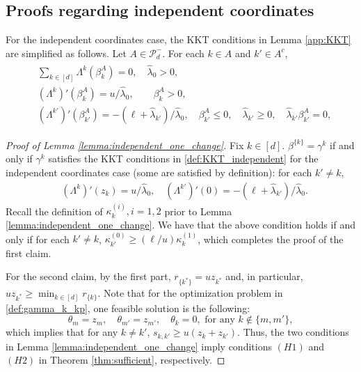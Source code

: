 \documentclass[aap,preprint]{imsart}
\theoremstyle{plain}
\theoremstyle{definition}
\begin{document}
\begin{appendix}
\subsection{Proofs regarding independent coordinates}\label{app:independent_streams}
For the independent coordinates case, the KKT conditions in Lemma \ref{app:KKT} are simplified as follows.
Let $A \in \mathcal{P}_{d}^{-}$.  For each $k \in A$ and $k' \in A^c$,
\begin{align}\label{def:KKT_independent}
\begin{split}
& \sum_{k \in [d]} \Lambda^{k}(\beta^A_k) = 0, \quad \widehat{\lambda}_0 > 0,\\ 
&(\Lambda^{k})'(\beta^A_k) = u/\widehat{\lambda}_0, \qquad \beta^A_{k} > 0, \\
& (\Lambda^{k'})'(\beta^A_{k'}) = -(\ell + \widehat{\lambda}_{k'})/\widehat{\lambda}_0, \quad \beta^A_{k'} \leq 0, \quad \widehat{\lambda}_{k'} \geq 0, \quad
\widehat{\lambda}_{k'} \beta^A_{k'} = 0,
\end{split}
\end{align}

\begin{proof}[Proof of Lemma \ref{lemma:independent_one_change}]
Fix $k \in [d]$. $\beta^{\{k\}} = \gamma^k$ if and only if $\gamma^{k}$ satisfies the KKT conditions in \eqref{def:KKT_independent} for the independent coordinates case (some are satisfied by definition): for each $k' \neq k$,
\begin{align*}
&(\Lambda^{k})'(z_k) = u/\widehat{\lambda}_0, \quad
(\Lambda^{k'})'(0) = -(\ell + \widehat{\lambda}_{k'})/\widehat{\lambda}_0.
\end{align*}
Recall the definition of $\kappa_{k}^{(i)}, i = 1,2$ prior to Lemma \ref{lemma:independent_one_change}. We have that the above condition holds if and only if  for each $k' \neq k$,
$\kappa^{(0)}_{k'} \geq (\ell/u) \kappa_{k}^{(1)}
$, which completes the proof of the first claim.

For the second claim, by the first part, $r_{\{k^*\}} = u z_{k^*}$ and, in particular, $u z_{k^*} \geq \min_{k \in [d]} r_{\{k\}}$. Note that for the optimization problem in \eqref{def:gamma_k_kp}, one feasible solution is the following:
$$
\theta_{m} = z_{m}, \quad \theta_{m'}= z_{m'}, \quad
\theta_{k} = 0, \text{ for any } k \not\in\{m,m'\},
$$
which implies that for any $k \neq k'$, $s_{k,k'} \geq u(z_{k}+z_{k'})$. Thus, the two conditions in Lemma \ref{lemma:independent_one_change} imply conditions $(H1)$  and $(H2)$ in Theorem \ref{thm:sufficient}, respectively. 
\end{proof}


\end{appendix}
\end{document}
